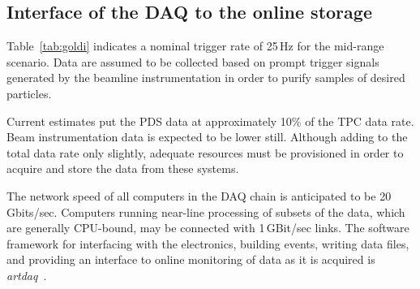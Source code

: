 \subsection{Interface of the DAQ to the online storage}
\label{sec:DAQ_online_interface}

Table~\ref{tab:goldi} indicates a nominal trigger rate of 25\,Hz for
the mid-range scenario. 
 Data are assumed to be
collected based on prompt trigger signals generated by the beamline
instrumentation in order to purify samples of desired particles.

Current estimates put the PDS data at approximately 10\% 
of the TPC data rate.  Beam instrumentation data is expected to be lower still.
Although adding to the
total data rate only slightly, adequate resources must
be provisioned in order to acquire and store the data from these
systems.  

The network speed of all computers in the DAQ
chain is anticipated to be 20\,Gbits/sec. 
 Computers running near-line
processing of subsets of the data, which are generally CPU-bound, may
be connected with 1\,GBit/sec links.  The software framework for
interfacing with the electronics, building events, writing data files,
and providing an interface to online monitoring of data as it is
acquired is {\it artdaq}~\cite{artdaq}.

